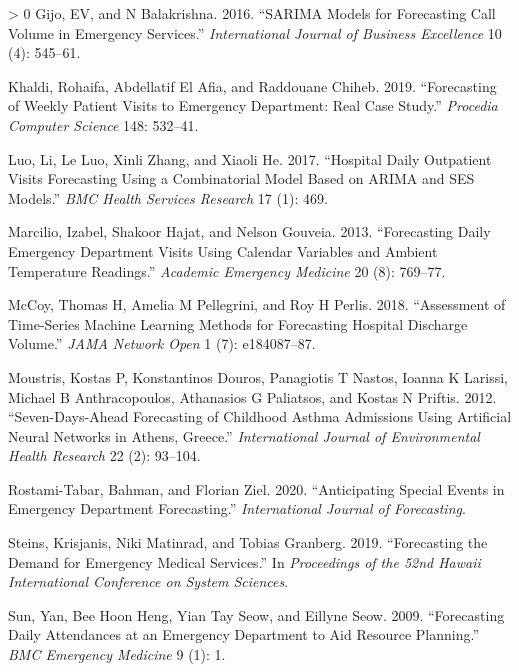 \documentclass[]{elsarticle} %
\newlength{\cslhangindent}
\newenvironment{CSLReferences}[3] %
 {%
  \setlength{\parindent}{0pt}
  \ifodd #1 \everypar{\setlength{\hangindent}{\cslhangindent}}\ignorespaces\fi
  \ifnum #2 > 0
  \setlength{\parskip}{#3\baselineskip}
  \fi
 }%
 {}
\begin{document}
\hypertarget{refs}{}
\begin{CSLReferences}{1}{0}
\leavevmode\hypertarget{ref-gijo2016sarima}{}%
Gijo, EV, and N Balakrishna. 2016. {``SARIMA Models for Forecasting Call Volume in Emergency Services.''} \emph{International Journal of Business Excellence} 10 (4): 545--61.

\leavevmode\hypertarget{ref-khaldi2019forecasting}{}%
Khaldi, Rohaifa, Abdellatif El Afia, and Raddouane Chiheb. 2019. {``Forecasting of Weekly Patient Visits to Emergency Department: Real Case Study.''} \emph{Procedia Computer Science} 148: 532--41.

\leavevmode\hypertarget{ref-luo2017hospital}{}%
Luo, Li, Le Luo, Xinli Zhang, and Xiaoli He. 2017. {``Hospital Daily Outpatient Visits Forecasting Using a Combinatorial Model Based on ARIMA and SES Models.''} \emph{BMC Health Services Research} 17 (1): 469.

\leavevmode\hypertarget{ref-marcilio2013forecasting}{}%
Marcilio, Izabel, Shakoor Hajat, and Nelson Gouveia. 2013. {``Forecasting Daily Emergency Department Visits Using Calendar Variables and Ambient Temperature Readings.''} \emph{Academic Emergency Medicine} 20 (8): 769--77.

\leavevmode\hypertarget{ref-mccoy2018assessment}{}%
McCoy, Thomas H, Amelia M Pellegrini, and Roy H Perlis. 2018. {``Assessment of Time-Series Machine Learning Methods for Forecasting Hospital Discharge Volume.''} \emph{JAMA Network Open} 1 (7): e184087--87.

\leavevmode\hypertarget{ref-moustris2012seven}{}%
Moustris, Kostas P, Konstantinos Douros, Panagiotis T Nastos, Ioanna K Larissi, Michael B Anthracopoulos, Athanasios G Paliatsos, and Kostas N Priftis. 2012. {``Seven-Days-Ahead Forecasting of Childhood Asthma Admissions Using Artificial Neural Networks in Athens, Greece.''} \emph{International Journal of Environmental Health Research} 22 (2): 93--104.

\leavevmode\hypertarget{ref-rostami2020anticipating}{}%
Rostami-Tabar, Bahman, and Florian Ziel. 2020. {``Anticipating Special Events in Emergency Department Forecasting.''} \emph{International Journal of Forecasting}.

\leavevmode\hypertarget{ref-steins2019forecasting}{}%
Steins, Krisjanis, Niki Matinrad, and Tobias Granberg. 2019. {``Forecasting the Demand for Emergency Medical Services.''} In \emph{Proceedings of the 52nd Hawaii International Conference on System Sciences}.

\leavevmode\hypertarget{ref-sun2009forecasting}{}%
Sun, Yan, Bee Hoon Heng, Yian Tay Seow, and Eillyne Seow. 2009. {``Forecasting Daily Attendances at an Emergency Department to Aid Resource Planning.''} \emph{BMC Emergency Medicine} 9 (1): 1.


\end{CSLReferences}
\end{document}
